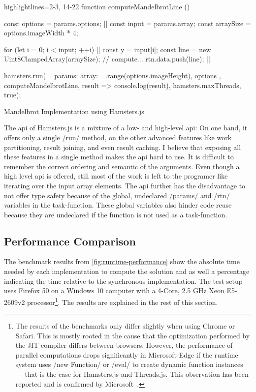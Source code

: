 \begin{listing}
\begin{javascriptcode*}{highlightlines={2-3, 14-22}}
function computeMandelbrotLine () {
	const options = params.options; |$\label{code:hamstersjs-params}$|
	const input = params.array;
	const arraySize = options.imageWidth * 4;

	for (let i = 0; i < input; ++i) {|$\label{code:hamsterjs-iterate}$|
		const y = input[i];
		const line = new Uint8ClampedArray(arraySize);
		// compute...
		rtn.data.push(line); |$\label{code:hamsterjs-result}$|
	}
}

hamsters.run( |$\label{code:hamsterjs-start}$|
	params: {
		array: _.range(options.imageHeight),
		options
	},  
	computeMandelbrotLine, 
	result => console.log(result), 
	hamsters.maxThreads, 
	true);
\end{javascriptcode*}
\caption{Mandelbrot Implementation using Hamsters.js}
\label{fig:mandelbrot-hamsterjs}
\end{listing}

The api of Hamsters.js is a mixture of a low- and high-level api: On one hand, it offers only a single \javascriptinline/run/ method, on the other advanced features like work partitioning, result joining, and even result caching. I believe that exposing all these features in a single method makes the api hard to use. It is difficult to remember the correct ordering and semantic of the arguments. Even though a high level api is offered, still most of the work is left to the programer like iterating over the input array elements. The api further has the disadvantage to not offer type safety because of the global, undeclared \javascriptinline/params/ and \javascriptinline/rtn/ variables in the task-function. These global variables also hinder code reuse because they are undeclared if the function is not used as a task-function. 

\subsection{Performance Comparison}
The benchmark results from \cref{fig:runtime-performance} show the absolute time needed by each implementation to compute the solution and as well a percentage indicating the time relative to the synchronous implementation. The test setup uses Firefox 50 on a Windows 10 computer with a 4-Core, 2.5 GHz Xeon E5-2609v2 processor\footnote{The results of the benchmarks only differ slightly when using Chrome or Safari. This is mostly rooted in the cause that the optimization performed by the JIT compiler differs between browsers. However, the performance of parallel computations drops significantly in Microsoft Edge if the runtime system uses \javascriptinline/new Function/ or \javascriptinline/eval/ to create dynamic function instances --- that is the case for Hamsters.js and Threads.js. This observation has been reported and is confirmed by Microsoft~\cite{newFunctionWebWorkerEdge}.}. The results are explained in the rest of this section.

